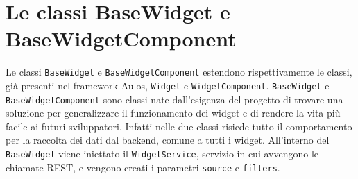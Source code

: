 \section{Le classi BaseWidget e BaseWidgetComponent}

Le classi \verb|BaseWidget| e \verb|BaseWidgetComponent| estendono rispettivamente le classi, già presenti nel framework Aulos, \verb|Widget| e \verb|WidgetComponent|. \verb|BaseWidget| e \verb|BaseWidgetComponent| sono classi nate dall'esigenza del progetto di trovare una soluzione per generalizzare il funzionamento dei widget e di rendere la vita più facile ai futuri sviluppatori.
Infatti nelle due classi risiede tutto il comportamento per la raccolta dei dati dal backend, comune a tutti i widget.
All'interno del \verb|BaseWidget| viene iniettato il \verb|WidgetService|, servizio in cui avvengono le chiamate REST, e vengono creati i parametri \verb|source| e \verb|filters|. \\

